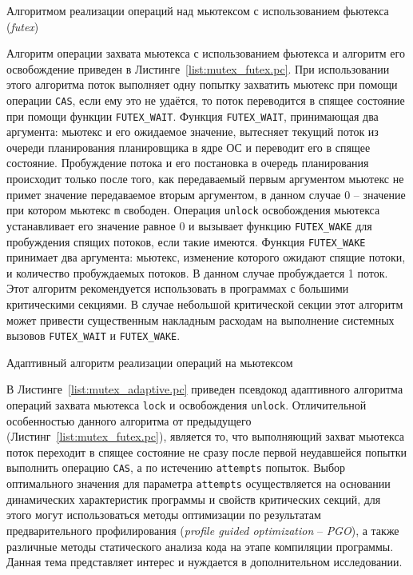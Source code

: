\begin{algorithm}[!h]
	
    \caption{Алгоритмом реализации операций над мьютексом с использованием фьютекса (\textit{futex})}
    \label{list:mutex_futex.pc}
\end{algorithm}

Алгоритм операции захвата мьютекса с использованием фьютекса и алгоритм его освобождение приведен в Листинге~\ref{list:mutex_futex.pc}. При использовании этого алгоритма поток выполняет одну попытку захватить мьютекс при помощи операции \texttt{CAS}, если ему это не удаётся, то поток переводится в спящее состояние при помощи функции \texttt{FUTEX\_WAIT}. Функция \texttt{FUTEX\_WAIT}, принимающая два аргумента: мьютекс и его ожидаемое значение, вытесняет текущий поток из очереди планирования планировщика в ядре ОС и переводит его в спящее состояние. Пробуждение потока и его постановка в очередь планирования происходит только после того, как передаваемый первым аргументом мьютекс не примет значение передаваемое вторым аргументом, в данном случае 0 -- значение при котором мьютекс \texttt{m} свободен. Операция \texttt{unlock} освобождения мьютекса устанавливает его значение равное 0 и вызывает функцию \texttt{FUTEX\_WAKE} для пробуждения спящих потоков, если такие имеются. Функция \texttt{FUTEX\_WAKE} принимает два аргумента: мьютекс, изменение которого ожидают спящие потоки, и количество пробуждаемых потоков. В данном случае пробуждается 1 поток. Этот алгоритм рекомендуется использовать в программах с большими критическими секциями. В случае небольшой критической секции этот алгоритм может привести существенным накладным расходам на выполнение системных вызовов \texttt{FUTEX\_WAIT} и \texttt{FUTEX\_WAKE}.

\begin{algorithm}[!h]
	
    \caption{Адаптивный алгоритм реализации операций на мьютексом}
    \label{list:mutex_adaptive.pc}
\end{algorithm}

В Листинге~\ref{list:mutex_adaptive.pc} приведен псевдокод адаптивного алгоритма операций захвата мьютекса \texttt{lock} и освобождения \texttt{unlock}. Отличительной особенностью данного алгоритма от предыдущего (Листинг~\ref{list:mutex_futex.pc}), является то, что выполняющий захват мьютекса поток переходит в спящее состояние не сразу после первой неудавшейся попытки выполнить операцию \texttt{CAS}, а по истечению \texttt{attempts} попыток. Выбор оптимального значения для параметра \texttt{attempts} осуществляется на основании динамических характеристик программы и свойств критических секций, для этого могут использоваться методы оптимизации по результатам предварительного профилирования (\textit{profile guided optimization} -- \textit{PGO}), а также различные методы статического анализа кода на этапе компиляции программы. Данная тема представляет интерес и нуждается в дополнительном исследовании.

